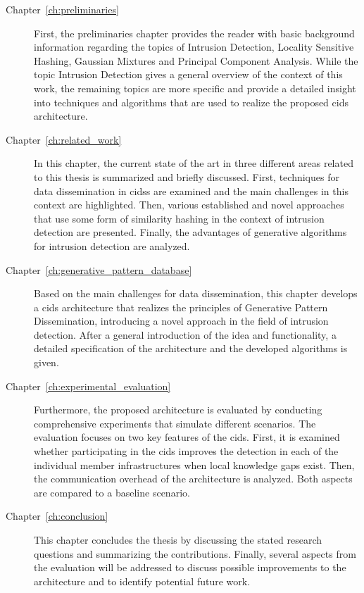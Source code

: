 \documentclass[../../main.tex]{subfiles}
\begin{document}
\begin{description}
    \item[Chapter~\ref{ch:preliminaries}] First, the preliminaries chapter provides the reader with basic background information regarding the topics of Intrusion Detection, Locality Sensitive Hashing, Gaussian Mixtures and Principal Component Analysis. While the topic Intrusion Detection gives a general overview of the context of this work, the remaining topics are more specific and provide a detailed insight into techniques and algorithms that are used to realize the proposed \acrshort{cids} architecture.
    \item[Chapter~\ref{ch:related_work}] In this chapter, the current state of the art in three different areas related to this thesis is summarized and briefly discussed. First, techniques for data dissemination in \glspl{cids} are examined and the main challenges in this context are highlighted. Then, various established and novel approaches that use some form of similarity hashing in the context of intrusion detection are presented. Finally, the advantages of generative algorithms for intrusion detection are analyzed.
    \item[Chapter~\ref{ch:generative_pattern_database}] Based on the main challenges for data dissemination, this chapter develops a \gls{cids} architecture that realizes the principles of Generative Pattern Dissemination, introducing a novel approach in the field of intrusion detection. After a general introduction of the idea and functionality, a detailed specification of the architecture and the developed algorithms is given.
    \item[Chapter~\ref{ch:experimental_evaluation}] Furthermore, the proposed architecture is evaluated by conducting comprehensive experiments that simulate different scenarios. The evaluation focuses on two key features of the \gls{cids}. First, it is examined whether participating in the \gls{cids} improves the detection in each of the individual member infrastructures when local knowledge gaps exist. Then, the communication overhead of the architecture is analyzed. Both aspects are compared to a baseline scenario.
    \item[Chapter~\ref{ch:conclusion}] This chapter concludes the thesis by discussing the stated research questions and summarizing the contributions. Finally, several aspects from the evaluation will be addressed to discuss possible improvements to the architecture and to identify potential future work.
\end{description}
\end{document}
